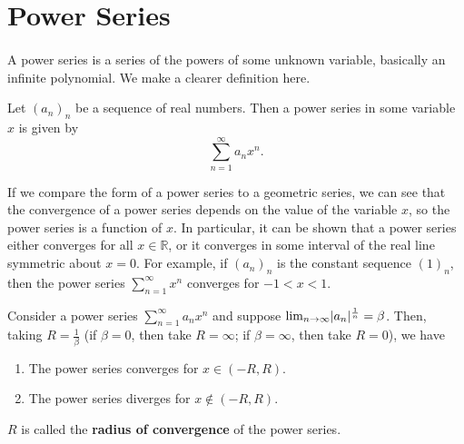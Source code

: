\documentclass[../real_analysis.tex]{subfiles}
\begin{document}
    \section{Power Series}
        \paragraph{}
        A power series is a series of the powers of some unknown variable, basically an infinite polynomial. We make a clearer definition here.
        \begin{definition}
            Let $(a_n)_n$ be a sequence of real numbers. Then a power series in some variable $x$ is given by
            \begin{equation*}
                \sum_{n=1}^\infty a_nx^n.
            \end{equation*}
        \end{definition}
        If we compare the form of a power series to a geometric series, we can see that the convergence of a power series depends on the value of the variable $x$, so the power series is a function of $x$. In particular, it can be shown that a power series either converges for all $x\in\mathbb{R}$, or it converges in some interval of the real line symmetric about $x=0$. For example, if $(a_n)_n$ is the constant sequence $(1)_n$, then the power series $\sum_{n=1}^\infty x^n$ converges for $-1<x<1$.
        \begin{theorem}
            Consider a power series $\sum_{n=1}^\infty a_nx^n$ and suppose $\lim_{n\to\infty}\lvert a_n\rvert^\frac{1}{n}=\beta$. Then, taking $R=\frac{1}{\beta}$ (if $\beta=0$, then take $R=\infty$; if $\beta=\infty$, then take $R=0$), we have
            \begin{enumerate}[\upshape(i)]
                \item The power series converges for $x\in(-R, R)$.
                \item The power series diverges for $x\notin(-R, R)$.
            \end{enumerate}
            $R$ is called the \textbf{radius of convergence} of the power series.
        \end{theorem}
\end{document}
